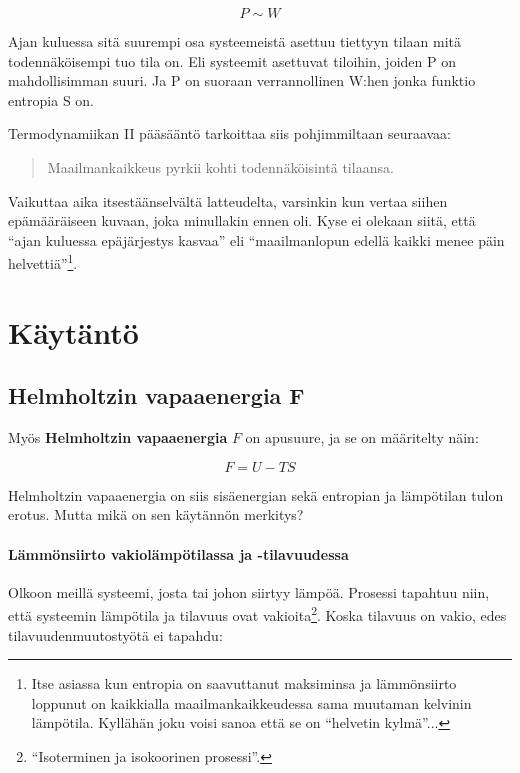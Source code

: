 \documentclass[12pt,a4paper,finnish]{book}
\begin{document}
\begin{equation}
 P \sim W
\end{equation}

Ajan kuluessa sitä suurempi osa systeemeistä asettuu tiettyyn tilaan mitä todennäköisempi tuo tila on.
Eli systeemit asettuvat tiloihin, joiden P on mahdollisimman suuri. Ja P on suoraan verrannollinen W:hen 
jonka funktio entropia S on.

Termodynamiikan II pääsääntö tarkoittaa siis pohjimmiltaan seuraavaa:

\begin{quote}
 Maailmankaikkeus pyrkii kohti todennäköisintä tilaansa.
\end{quote}

Vaikuttaa aika itsestäänselvältä latteudelta, varsinkin kun vertaa siihen epämääräiseen kuvaan, joka 
minullakin ennen oli. Kyse ei olekaan siitä, että ``ajan kuluessa epäjärjestys kasvaa'' eli 
``maailmanlopun edellä kaikki menee päin helvettiä''\footnote{Itse asiassa kun entropia on saavuttanut 
maksiminsa ja lämmönsiirto loppunut on kaikkialla maailmankaikkeudessa sama muutaman kelvinin lämpötila. 
Kyllähän joku voisi sanoa että se on ``helvetin kylmä''...}.


\section{Käytäntö} %

\subsection{Helmholtzin vapaaenergia F} \label{sssection:helmholtz}

Myös \textbf{Helmholtzin vapaaenergia} $F$ on apusuure, ja se on määritelty näin:

\begin{equation}
 F = U - TS
\end{equation}

Helmholtzin vapaaenergia on siis sisäenergian sekä entropian ja lämpötilan tulon erotus. Mutta mikä on sen 
käytännön merkitys?

\paragraph{Lämmönsiirto vakiolämpötilassa ja -tilavuudessa}

Olkoon meillä systeemi, josta tai johon siirtyy lämpöä. Prosessi tapahtuu niin, että systeemin lämpötila ja 
tilavuus ovat vakioita\footnote{``Isoterminen ja isokoorinen prosessi''.}. 
Koska tilavuus on vakio, edes tilavuudenmuutostyötä ei tapahdu:
\end{document}
